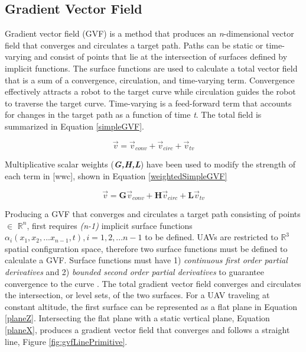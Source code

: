 \documentclass[numbered,pdftex]{ohio-etd}
\begin{document}
\subsection{Gradient Vector Field}
Gradient vector field (GVF) is a method that produces an \textit{n}-dimensional vector field that converges and circulates a target path\cite{goncalves_artificial_2009}. Paths can be static or time-varying and consist of points that lie at the intersection of surfaces defined by implicit functions. The surface functions are used to calculate a total vector field that is a sum of a convergence, circulation, and time-varying term. Convergence effectively attracts a robot to the target curve while circulation guides the robot to traverse the target curve. Time-varying is a feed-forward term that accounts for changes in the target path as a function of time \textit{t}. The total field is summarized in Equation \ref{simpleGVF}.

\begin{equation}\label{simpleGVF}
\vec{v} = \vec{v}_{conv} + \vec{v}_{circ} + \vec{v}_{tv} 
\end{equation}

Multiplicative scalar weights (\textit{\textbf{G,H,L}}) have been used to modify the strength of each term in \cite{goncalves_circulation_2010}[wwc], shown in Equation \ref{weightedSimpleGVF}

\begin{equation}\label{weightedSimpleGVF}
\vec{v} = \boldsymbol{G}\vec{v}_{conv} + \boldsymbol{H}\vec{v}_{circ} + \boldsymbol{L}\vec{v}_{tv} 
\end{equation}


Producing a GVF that converges and circulates a target path consisting of points $\in$ $\mathbb{R}^n$, first requires \textit{(n-1)} implicit surface functions {$\alpha_i(x_1,x_2,...x_{n-1},t), i=1,2,...n-1$} to be defined. UAVs are restricted to $\mathbb{R}^3$ spatial configuration space, therefore two surface functions must be defined to calculate a GVF. Surface functions must have 1) \textit{continuous first order partial derivatives} and 2)\textit{ bounded second order partial derivatives} to guarantee convergence to the curve \cite{goncalves_circulation_2010}. The total gradient vector field converges and circulates the intersection, or level sets, of the two surfaces. For a UAV traveling at constant altitude, the first surface can be represented as a flat plane in Equation \ref{planeZ}. Intersecting the flat plane with a static vertical plane, Equation \ref{planeX}, produces a gradient vector field that converges and follows a straight line, Figure \ref{fig:gvfLinePrimitive}.
\end{document}
